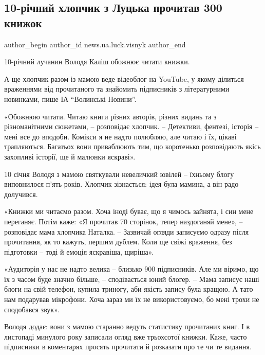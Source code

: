  
 
 
 
 
 
\subsection{10-річний хлопчик з Луцька прочитав 300 книжок}
\label{sec:23_01_2022.stz.news.ua.luck.visnyk.1.malchik_300_knigi_chtenie}
 
\ifcmt
 author_begin
   author_id news.ua.luck.visnyk
 author_end
\fi

10-річний лучанин Володя Каліш обожнює читати книжки. 

А ще хлопчик разом із мамою веде відеоблог на YouTube, у якому ділиться
враженнями від прочитаного та знайомить підписників з літературними новинками,
пише ІА \enquote{Волинські Новини}. 


«Обожнюю читати. Читаю книги різних авторів, різних видань та з різноманітними
сюжетами, – розповідає хлопчик. – Детективи, фентезі, історія – мені все до
вподоби. Комікси я не надто полюбляю, але читаю і їх, цікаві трапляються.
Багатьох вони приваблюють тим, що коротенько розповідають якісь захопливі
історії, ще й малюнки яскраві».

10 січня Володя з мамою святкували невеличкий ювілей – їхньому блогу
виповнилося п’ять років. Хлопчик зізнається: ідея була мамина, а він радо
долучився.


«Книжки ми читаємо разом. Хоча іноді буває, що я чимось зайнята, і син мене
переганяє. Потім каже: «Я прочитав 70 сторінок, тепер наздоганяй мене», –
розповідає мама хлопчика Наталка. – Зазвичай огляди записуємо одразу після
прочитання, як то кажуть, першим дублем. Коли ще свіжі враження, без підготовки
– тоді й емоція яскравіша, щиріша».

«Аудиторія у нас не надто велика – близько 900 підписників. Але ми віримо, що
їх з часом буде значно більше, – сподівається юний блогер. – Мама записує наші
блоги на свій телефон, купила триногу, аби якість запису була кращою. А тато
нам подарував мікрофони. Хоча зараз ми їх не використовуємо, бо мені трохи не
сподобався звук».

Володя додає: вони з мамою старанно ведуть статистику прочитаних книг. І в
листопаді минулого року записали огляд вже трьохсотої книжки. Каже, часто
підписники в коментарях просять прочитати й розказати про те чи те видання.
